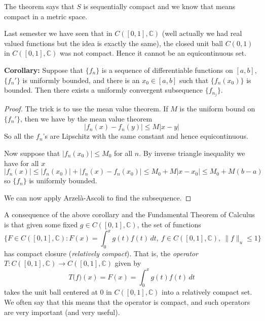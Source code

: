 \documentclass[12pt]{book}
\newcommand{\snorm}[1]{\lVert {#1} \rVert}
\newcommand{\abs}[1]{\left\lvert {#1} \right\rvert}
\newcommand{\C}{{\mathbb{C}}}
\theoremstyle{plain}
\theoremstyle{remark}
\theoremstyle{definition}
\theoremstyle{exercise}
\theoremstyle{example}
\begin{document}
\medskip

The theorem says that $S$
is sequentially compact and we know that means
compact in a metric space.

Last semester we have seen that in $C([0,1],\C)$ (well actually we had real
valued functions but the idea is exactly the same), the closed unit ball
$C(0,1)$ in $C([0,1],\C)$ was not compact.  Hence it cannot be an
equicontinuous set.

\medskip

\textbf{Corollary:}
Suppose that $\{ f_n \}$ is a sequence of differentiable functions on $[a,b]$,
$\{ f_n' \}$ is uniformly bounded, and there is an
$x_0 \in [a,b]$ such that $\{ f_n(x_0) \}$ is bounded.
Then there exists a uniformly convergent
subsequence $\{ f_{n_j} \}$.

\medskip

\begin{proof}
The trick is to use the mean value theorem.  If $M$ is the uniform bound on
$\{ f_n' \}$, then we have by the mean value theorem
\begin{equation*}
\abs{f_n(x)-f_n(y)} \leq M \abs{x-y}
\end{equation*}
So all the $f_n$'s are Lipschitz with the same constant and hence
equicontinuous.

Now suppose that $\abs{f_n(x_0)} \leq M_0$ for all $n$.
By inverse triangle inequality we have for all $x$
$$
\abs{f_n(x)} \leq \abs{f_n(x_0)}+ \abs{f_n(x)-f_n(x_0)} \leq M_0+ M \abs{x-x_0}
\leq M_0 + M(b-a)
$$
so $\{ f_n \}$ is uniformly bounded.

We can now apply Arzel\`a-Ascoli to find the subsequence.
\end{proof}

\medskip

A consequence of the above corollary and the Fundamental Theorem of Calculus
is that given some fixed $g \in
C([0,1],\C)$,
the set of functions
$$
\{ F \in C([0,1],\C) : F(x) = \int_0^x g(t) f(t)\,dt,~ f \in C([0,1],\C),~
\snorm{f}_u \leq 1 \}
$$
has compact closure (\emph{relatively compact}).
That is, the \emph{operator} $T \colon C([0,1],\C) \to C([0,1],\C)$ given by
$$
T\bigl(f\bigr) (x) = F(x) = \int_0^x g(t) f(t)\,dt
$$
takes the unit ball centered at 0 in $C([0,1],\C)$ into a relatively compact set.  We often
say that this means that the operator is compact, and such operators are very
important (and very useful).

\medskip

\end{document}
